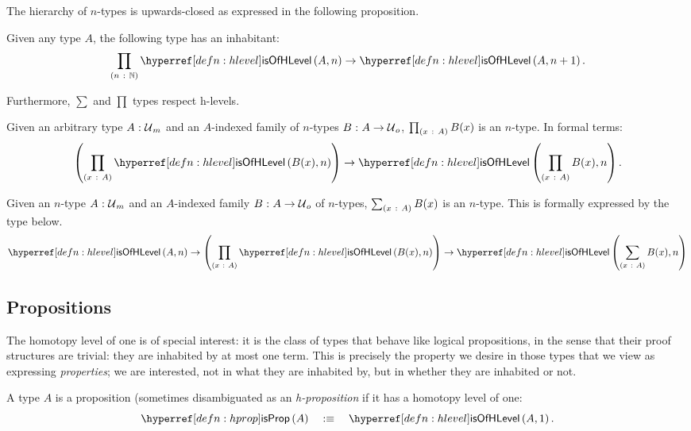 The hierarchy of $n$-types is upwards-closed as expressed in the following proposition.
\begin{prop}\label{prop:level-up}
  Given any type $A$, the following type has an inhabitant:
  \begin{equation*}
    \pity{n}{\mathbb{N}}{\isofhlevel{A}{n} \rightarrow \isofhlevel{A}{n+1}}.
  \end{equation*}
\end{prop}

Furthermore, $\sum$ and $\prod$ types respect h-levels.
\begin{prop}\label{prop:is-of-level-pi}
  Given an arbitrary type $A\hspace{0.1mm}:\hspace{0.1mm}\mathcal{U}{}_m$ and an $A$-indexed family of $n$-types
  $B\hspace{0.1mm}:\hspace{0.1mm}A \rightarrow \mathcal{U}{}_o$, $\prod_{(x~:~A)} B(x)$ is an $n$-type. In formal
  terms:
  \begin{equation*}
    \left( \pity{x}{A}{\isofhlevel{B(x)}{n}} \right)
      \rightarrow \isofhlevel{\pity{x}{A}{B(x)}}{n}.
  \end{equation*}
\end{prop}

\begin{prop}\label{prop:is-of-level-sigma}
  Given an $n$-type $A\hspace{0.1mm}:\hspace{0.1mm}\mathcal{U}{}_m$ and an $A$-indexed family
  $B\hspace{0.1mm}:\hspace{0.1mm}A \rightarrow \mathcal{U}{}_o$ of $n$-types, $\sum_{(x~:~A)} B(x)$ is an $n$-type.
  This is formally expressed by the type below.
  \begin{equation*}
      \isofhlevel{A}{n}
    \rightarrow \left( \pity{x}{A}{\isofhlevel{B(x)}{n}} \right)
    \rightarrow \isofhlevel{\sigmaty{x}{A}{B(x)}}{n}
  \end{equation*}
\end{prop}

\subsection{Propositions}

The homotopy level of one is of special interest: it is the class of types that behave
like logical propositions, in the sense that their proof structures are trivial: they are
inhabited by at most one term. This is precisely the property we desire in those types
that we view as expressing \emph{properties}; we are interested, not in what they are
inhabited by, but in whether they are inhabited or not.

\begin{defn}[Proposition]\label{defn:prop'}
  A type $A$ is a proposition (sometimes disambiguated as an \emph{h-proposition} if it
  has a homotopy level of one:
  \begin{equation*}
    \isprop{A} \quad\is\quad \isofhlevel{A}{1}.
  \end{equation*}
\end{defn}

